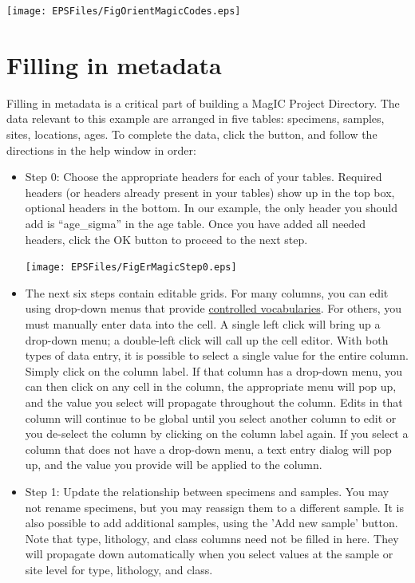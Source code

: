 \documentclass[11pt]{book}
\begin{document}
{\texttt{[image: EPSFiles/FigOrientMagicCodes.eps]}

\section{Filling in metadata}

Filling in metadata is a critical part of building a MagIC Project Directory. The data relevant to this example are arranged in five tables: specimens, samples, sites, locations, ages. To complete the data, click the button, and follow the directions in the help window in order:

\begin{itemize}
\item Step 0: Choose the appropriate headers for each of your tables.  Required headers (or headers already present in your tables) show up in the top box, optional headers in the bottom.  In our example, the only header you should add is ``age\_sigma'' in the age table.  Once you have added all needed headers, click the OK button to proceed to the next step.

 \texttt{[image: EPSFiles/FigErMagicStep0.eps]}

 \item The next six steps contain editable grids.  For many columns, you can edit using drop-down menus that provide \href{http://earthref.org/MAGIC/shortlists.htm}{controlled vocabularies}.  For others, you must manually enter data into the cell.  A single left click will bring up a drop-down menu; a double-left click will call up the cell editor.  With both types of data entry, it is possible to select a single value for the entire column. Simply click on the column label.  If that column has a drop-down menu, you can then click on any cell in the column, the appropriate menu will pop up, and the value you select will propagate throughout the column.  Edits in that column will continue to be global until you select another column to edit or you de-select the column by clicking on the column label again.  If you select a column that does not have a drop-down menu, a text entry dialog will pop up, and the value you provide will be applied to the column.

 \item Step 1: Update the relationship between specimens and samples.  You may not rename specimens, but you may reassign them to a different sample.  It is also possible to add additional samples, using the 'Add new sample' button.  Note that type, lithology, and class columns need not be filled in here.  They will propagate down automatically when you select values at the sample or site level for type, lithology, and class.


\end{itemize}}
\end{document}
